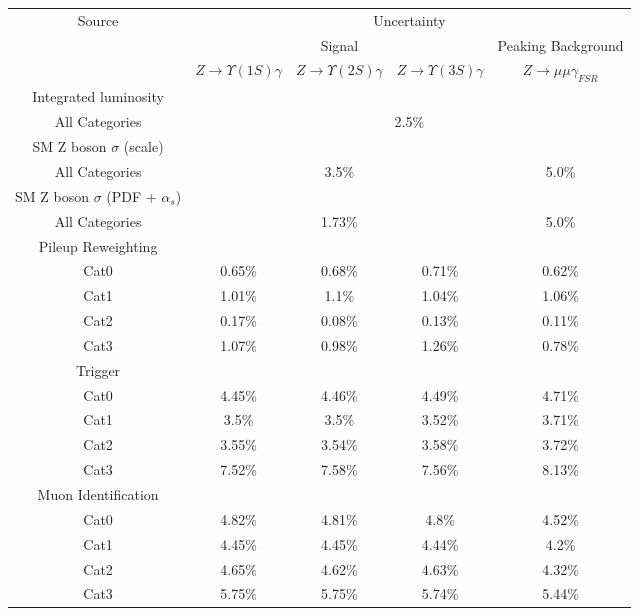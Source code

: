 
\begin{tabular}{c|c|c|c|c}
\cline{1-5}
\multirow{3}{*}{Source} & \multicolumn{4}{c}{Uncertainty} \\
\cline{2-5}
& \multicolumn{3}{c|}{Signal} & Peaking Background   \\
\cline{2-5}
& $Z \rightarrow \Upsilon(1S)  \gamma$ & $Z \rightarrow \Upsilon(2S)  \gamma$ & $Z \rightarrow \Upsilon(3S)  \gamma$ & $Z \rightarrow \mu\mu\gamma_{FSR}$  \\
\hline\hline
Integrated luminosity & \multicolumn{4}{l}{} \\ \hline
All Categories & \multicolumn{4}{c}{2.5\%} \\
\hline\hline
SM Z boson $\sigma$ (scale) & \multicolumn{4}{l}{} \\ \hline
All Categories & \multicolumn{3}{c|}{3.5\%}  & \multicolumn{1}{c}{5.0\%} \\
\hline\hline
SM Z boson $\sigma$ (PDF + $\alpha_s$)  & \multicolumn{4}{l}{} \\ \hline
All Categories & \multicolumn{3}{c|}{1.73\%}  & \multicolumn{1}{c}{5.0\%} \\
\hline\hline
Pileup Reweighting  & \multicolumn{4}{l}{} \\ \hline
Cat0 & 0.65\% & 0.68\% & 0.71\% & 0.62\% \\
Cat1 & 1.01\% & 1.1\% & 1.04\% & 1.06\% \\
Cat2 & 0.17\% & 0.08\% & 0.13\% & 0.11\% \\
Cat3 & 1.07\% & 0.98\% & 1.26\% & 0.78\% \\
\hline\hline
Trigger  & \multicolumn{4}{l}{} \\ \hline
Cat0 & 4.45\% & 4.46\% & 4.49\% & 4.71\% \\
Cat1 & 3.5\% & 3.5\% & 3.52\% & 3.71\% \\
Cat2 & 3.55\% & 3.54\% & 3.58\% & 3.72\% \\
Cat3 & 7.52\% & 7.58\% & 7.56\% & 8.13\% \\
\hline\hline
Muon Identification & \multicolumn{4}{l}{} \\ \hline
Cat0 & 4.82\% & 4.81\% & 4.8\% & 4.52\% \\
Cat1 & 4.45\% & 4.45\% & 4.44\% & 4.2\% \\
Cat2 & 4.65\% & 4.62\% & 4.63\% & 4.32\% \\
Cat3 & 5.75\% & 5.75\% & 5.74\% & 5.44\% \\

\end{tabular}
